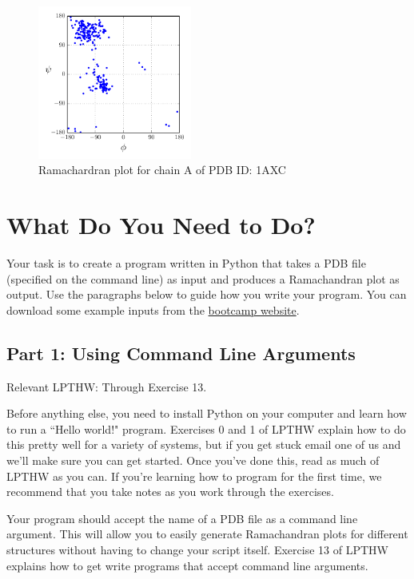 \documentclass{article}
\newenvironment{lpthw}
{Relevant LPTHW:}
{}
\begin{document}
\begin{figure}[h]
 \centering
 \includegraphics[width=0.45\textwidth]{example-plot}
 \caption{Ramachardran plot for chain A of PDB ID: 1AXC}
 \label{fig:example-plot}
\end{figure}

\section{What Do You Need to Do?}

Your task is to create a program written in Python that takes a PDB file 
(specified on the command line) as input and produces a Ramachandran plot as 
output.  Use the paragraphs below to guide how you write your  program.  You 
can download some example inputs from the
\href{http://bootcamp.ipqb.org/programming}{bootcamp website}.

\subsection{Part 1: Using Command Line Arguments}

\begin{lpthw}
Through Exercise 13.
\end{lpthw}

Before anything else, you need to install Python on your computer and learn how 
to run a ``Hello world!" program.  Exercises 0 and 1 of LPTHW explain how to do 
this pretty well for a variety of systems, but if you get stuck email one of us 
and we'll make sure you can get started.  Once you've done this, read as much 
of LPTHW as you can.  If you're learning how to program for the first time, we 
recommend that you take notes as you work through the exercises.

Your program should accept the name of a PDB file as a command line argument.  
This will allow you to easily generate Ramachandran plots for different 
structures without having to change your script itself.  Exercise 13 of LPTHW 
explains how to get write programs that accept command line arguments.
\end{document}
